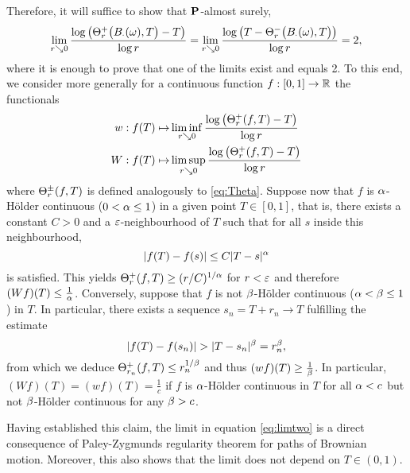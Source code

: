   Therefore, it will suffice to show that $\mathbf{P}$-almost surely, 
  \begin{equation}\label{eq:limtwo}
    \lim_{r\searrow 0}\frac{\log \big(\Theta^+_r\big(B_\cdot(\omega),T\big)-T\big)}{\log r}
    =\lim_{r\searrow 0}\frac{\log \big(T-\Theta^-_r\big(B_\cdot(\omega),T\big)\big)}{\log r}=2,
  \end{equation}
  where it is enough to prove that one of the limits exist and equals 2. To this end, we consider more generally for a continuous function $f:[0,1]\to \mathbb{R}$ the functionals
  \begin{align*}
    w:f(T)\mapsto &\liminf_{r\searrow0}\frac{\log\big(\Theta^+_r(f,T)-T\big)}{\log r}\\
    W:f(T)\mapsto &\limsup_{r\searrow0}\frac{\log\big(\Theta^+_r(f,T)-T\big)}{\log r}
  \end{align*}
  where $\Theta^\pm_r(f,T)$ is defined analogously to \eqref{eq:Theta}. Suppose now that $f$ is $\alpha$-H\"{o}lder 
  continuous ($0<\alpha\leq 1$) in a given point $T\in[0,1]$, that is, there exists a constant $C>0$ and a 
  $\varepsilon$-neighbourhood of $T$ such that for all $s$ inside this neighbourhood,
  \[
    |f(T)-f(s)|\leq C|T-s|^\alpha
  \]
  is satisfied. This yields $\Theta^+_r(f,T)\geq (r/C)^{1/\alpha}$ for $r<\varepsilon$ and therefore $(Wf)(T)\leq \frac{1}{\alpha}$. Conversely, suppose that $f$ is not $\beta$-H\"{o}lder continuous ($\alpha<\beta\leq 1$) in $T$. In particular, there exists a sequence $s_n=T+r_n\to T$ fulfilling the estimate 
  \[
    |f(T)-f(s_n)|>|T-s_n|^\gb=r_n^\gb,
  \]
  from which we deduce $\Theta^+_{r_n}(f,T)\leq r_n^{1/\beta}$ and thus $(wf)(T)\geq\frac{1}{\beta}$. In particular, 
  $(Wf)(T)=(wf)(T)=\frac{1}{c}$ if $f$ is $\alpha$-H\"{o}lder continuous in $T$ for all $\alpha<c$ but not $\beta$-H\"{o}lder continuous for any $\beta>c$. 
  
  Having established this claim, the limit in equation \eqref{eq:limtwo} is a direct consequence of Paley-Zygmunds regularity theorem for paths of Brownian motion. Moreover, this also shows that the limit does not depend on $T\in(0,1)$. 

